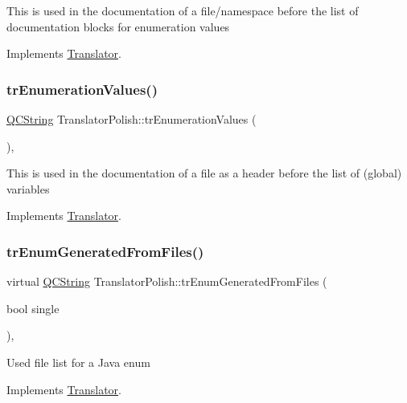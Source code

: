 This is used in the documentation of a file/namespace before the list of documentation blocks for enumeration values 

Implements \mbox{\hyperlink{class_translator}{Translator}}.

\mbox{\label{class_translator_polish_acc1f2f424ed7b646b977d05bc05bc44f}} 
\subsubsection{\texorpdfstring{trEnumerationValues()}{trEnumerationValues()}}
{\footnotesize\ttfamily \mbox{\hyperlink{class_q_c_string}{Q\+C\+String}} Translator\+Polish\+::tr\+Enumeration\+Values (\begin{DoxyParamCaption}{ }\end{DoxyParamCaption})\hspace{0.3cm}{\ttfamily [inline]}, {\ttfamily [virtual]}}

This is used in the documentation of a file as a header before the list of (global) variables 

Implements \mbox{\hyperlink{class_translator}{Translator}}.

\mbox{\label{class_translator_polish_aa65ca369d0edfce42f4ec052b9f78ab7}} 
\subsubsection{\texorpdfstring{trEnumGeneratedFromFiles()}{trEnumGeneratedFromFiles()}}
{\footnotesize\ttfamily virtual \mbox{\hyperlink{class_q_c_string}{Q\+C\+String}} Translator\+Polish\+::tr\+Enum\+Generated\+From\+Files (\begin{DoxyParamCaption}\item[{bool}]{single }\end{DoxyParamCaption})\hspace{0.3cm}{\ttfamily [inline]}, {\ttfamily [virtual]}}

Used file list for a Java enum 

Implements \mbox{\hyperlink{class_translator}{Translator}}.

